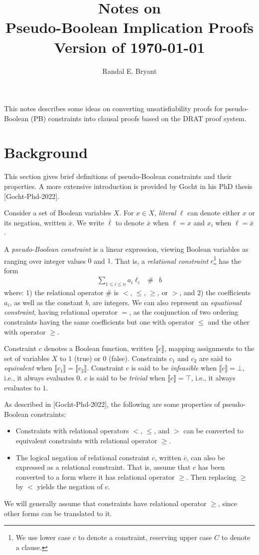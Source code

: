 \documentclass{easychair}
\title{Notes on \\ Pseudo-Boolean Implication Proofs \\ Version of \today}
\author{Randal E. Bryant}
\institute{
Computer Science Department \\
Carnegie Mellon University, Pittsburgh, PA, United States\\
\email{Randy.Bryant@cs.cmu.edu}
}
\renewcommand{\obar}[1]{\overline{#1}}
\newcommand{\lit}{\ell}
\newcommand{\func}[1]{\llbracket#1\rrbracket}
\begin{document}
\maketitle

This notes describes some ideas on converting unsatisfiability proofs
for pseudo-Boolean (PB) constraints into clausal proofs based on the
DRAT proof system.

\section{Background}

This section gives brief definitions of pseudo-Boolean constraints and their properties.
A more extensive introduction is provided by Gocht in his PhD thesis [Gocht-Phd-2022].

Consider a set of Boolean variables $X$.  For $x \in X$, {\em literal}
$\lit$ can denote either $x$ or its negation, written $\obar{x}$.  We
write $\obar{\lit}$ to denote $\obar{x}$ when $\lit = x$ and $x_i$ when
$\lit = \obar{x}$.

A {\em pseudo-Boolean constraint} is a linear expression, viewing
Boolean variables as ranging over integer values $0$ and $1$.  That
is, 
a \emph{relational constraint} $c$\footnote{We use lower case $c$ to denote a constraint, reserving upper case $C$ to denote a clause.}  has the form
\begin{eqnarray}
\sum_{1 \leq i \leq n} a_i \lit_i & \# & b \label{eqn:pbconstraint}
\end{eqnarray}
where:
1) the relational operator $\#$ is $<$, $\leq$, $\geq$, or $>$,
and 2) the coefficients $a_i$, as well as the constant $b$, are
integers.  We can also represent an \emph{equational constraint}, having
relational operator $=$, as the conjunction of two ordering constraints having the same coefficients but one with
operator $\leq$ and the other with operator $\geq$.


Constraint $c$ denotes a Boolean function, written
$\func{c}$, mapping assignments to the set of variables $X$ to $1$
(true) or $0$ (false).  Constraints $c_1$ and $c_2$ are said to {\em
  equivalent} when $\func{c_1} = \func{c_2}$.
Constraint $c$ is said to be {\em infeasible} when $\func{c} = \bot$, i.e., it always evaluates $0$.
$c$ is said to be {\em trivial} when $\func{c} = \top$, i.e., it always evaluates to $1$.

As described in [Gocht-Phd-2022], the following are some properties of pseudo-Boolean constraints:
\begin{itemize}
\item Constraints with relational operators $<$, $\leq$, and $>$ can be
  converted to equivalent constraints with relational operator $\geq$.
\item
The logical negation of relational constraint $c$, written $\obar{c}$,
can also be expressed as a relational constraint.  That is, assume that $c$
has been converted to a form where it has relational operator $\geq$.
Then replacing $\geq$ by $<$ yields the negation of $c$.  
\end{itemize}
We will generally
assume that constraints have relational operator $\geq$, since other
forms can be translated to it.
\end{document}
